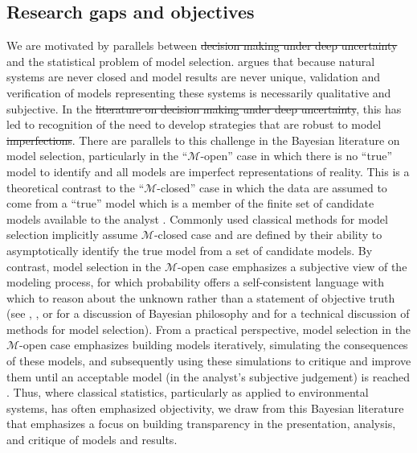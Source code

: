 \documentclass{agujournal2019}
\providecommand{\DIFadd}[1]{{\protect\color{blue}\uwave{#1}}} %
\providecommand{\DIFdel}[1]{{\protect\color{red}\sout{#1}}}                      %
\providecommand{\DIFaddbegin}{} %
\providecommand{\DIFaddend}{} %
\providecommand{\DIFdelbegin}{} %
\providecommand{\DIFdelend}{} %
\newcommand{\DIFscaledelfig}{0.5}
\newlength{\DIFdelgraphicswidth} %
\newlength{\DIFdelgraphicsheight} %
\newcommand{\DIFaddincludegraphics}[2][]{{\color{blue}\fbox{\DIFOincludegraphics[#1]{#2}}}} %
\newcommand{\DIFdelincludegraphics}[2][]{%
\sbox{\DIFdelgraphicsbox}{\DIFOincludegraphics[#1]{#2}}%
\settoboxwidth{\DIFdelgraphicswidth}{\DIFdelgraphicsbox} %
\settoboxtotalheight{\DIFdelgraphicsheight}{\DIFdelgraphicsbox} %
\scalebox{\DIFscaledelfig}{%
\parbox[b]{\DIFdelgraphicswidth}{\usebox{\DIFdelgraphicsbox}\\[-\baselineskip] \rule{\DIFdelgraphicswidth}{0em}}\llap{\resizebox{\DIFdelgraphicswidth}{\DIFdelgraphicsheight}{%
\setlength{\unitlength}{\DIFdelgraphicswidth}%
\begin{picture}(1,1)%
\thicklines\linethickness{2pt} %
{\color[rgb]{1,0,0}\put(0,0){\framebox(1,1){}}}%
{\color[rgb]{1,0,0}\put(0,0){\line( 1,1){1}}}%
{\color[rgb]{1,0,0}\put(0,1){\line(1,-1){1}}}%
\end{picture}%
}\hspace*{3pt}}} %
} %
\DeclareRobustCommand{\DIFaddbegin}{\DIFOaddbegin \let\includegraphics\DIFaddincludegraphics} %
\DeclareRobustCommand{\DIFaddend}{\DIFOaddend \let\includegraphics\DIFOincludegraphics} %
\DeclareRobustCommand{\DIFdelbegin}{\DIFOdelbegin \let\includegraphics\DIFdelincludegraphics} %
\DeclareRobustCommand{\DIFdelend}{\DIFOaddend \let\includegraphics\DIFOincludegraphics} %
\begin{document}
\subsection{Research gaps and objectives}

We are motivated by parallels between \DIFdelbegin \DIFdel{decision making under deep uncertainty }\DIFdelend \DIFaddbegin \DIFadd{\mbox{%
    \gls{dmdu} }\hspace{0pt}%
}\DIFaddend and the statistical problem of model selection.
 argues that because natural systems are never closed and model results are never unique, validation and verification of models representing these systems is necessarily qualitative and subjective.
In the \DIFdelbegin \DIFdel{literature on decision making under deep uncertainty}\DIFdelend \DIFaddbegin \DIFadd{\mbox{%
    \gls{dmdu} }\hspace{0pt}%
  literature}\DIFaddend , this has led to recognition of the need to develop strategies that are robust to model \DIFdelbegin \DIFdel{imperfections}\DIFdelend \DIFaddbegin \DIFadd{flaws}\DIFaddend .
There are parallels to this challenge in the Bayesian literature on model selection, particularly in the ``$\mathcal{M}$-open'' case in which there is no ``true'' model to identify and all models are imperfect representations of reality.
This is a theoretical contrast to the ``$\mathcal{M}$-closed'' case in which the data are assumed to come from a ``true'' model which is a member of the finite set of candidate models available to the analyst \cite{bernardo_bayesian:1994}.
Commonly used classical methods for model selection implicitly assume $\mathcal{M}$-closed case and are defined by their ability to asymptotically identify the true model from a set of candidate models.
By contrast, model selection in the $\mathcal{M}$-open case emphasizes a subjective view of the modeling process, for which probability offers a self-consistent language with which to reason about the unknown rather than a statement of objective truth (see , , or  for a discussion of Bayesian philosophy and  for a technical discussion of methods for model selection).
From a practical perspective, model selection in the $\mathcal{M}$-open case emphasizes building models iteratively, simulating the consequences of these models, and subsequently using these simulations to critique and improve them until an acceptable model (in the analyst's subjective judgement) is reached \cite{gelman_workflow:2020}.
Thus, where classical statistics, particularly as applied to environmental systems, has often emphasized objectivity, we draw from this Bayesian literature that  emphasizes a focus on building transparency in the presentation, analysis, and critique of models and results.
\end{document}
